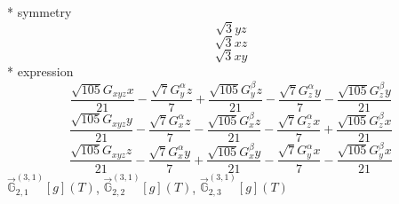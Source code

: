 \documentclass[fleqn,8pt]{jsarticle}
\begin{document}
\noindent\quad ** symmetry
\begin{dmath*}
\sqrt{3} y z
\end{dmath*}
\begin{dmath*}
\sqrt{3} x z
\end{dmath*}
\begin{dmath*}
\sqrt{3} x y
\end{dmath*}
\noindent\quad ** expression
\begin{dmath*}
\frac{\sqrt{105} G_{xyz} x}{21} - \frac{\sqrt{7} G_{y}^{\alpha} z}{7} + \frac{\sqrt{105} G_{y}^{\beta} z}{21} - \frac{\sqrt{7} G_{z}^{\alpha} y}{7} - \frac{\sqrt{105} G_{z}^{\beta} y}{21}
\end{dmath*}
\begin{dmath*}
\frac{\sqrt{105} G_{xyz} y}{21} - \frac{\sqrt{7} G_{x}^{\alpha} z}{7} - \frac{\sqrt{105} G_{x}^{\beta} z}{21} - \frac{\sqrt{7} G_{z}^{\alpha} x}{7} + \frac{\sqrt{105} G_{z}^{\beta} x}{21}
\end{dmath*}
\begin{dmath*}
\frac{\sqrt{105} G_{xyz} z}{21} - \frac{\sqrt{7} G_{x}^{\alpha} y}{7} + \frac{\sqrt{105} G_{x}^{\beta} y}{21} - \frac{\sqrt{7} G_{y}^{\alpha} x}{7} - \frac{\sqrt{105} G_{y}^{\beta} x}{21}
\end{dmath*}
\noindent\quad $\vec{\mathbb{G}}_{2,1}^{(3,1)}[g](T)$, $\vec{\mathbb{G}}_{2,2}^{(3,1)}[g](T)$, $\vec{\mathbb{G}}_{2,3}^{(3,1)}[g](T)$
\end{document}
